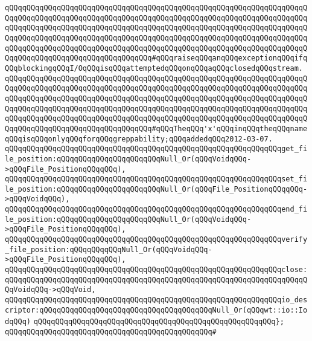 \verb|qQQqqQQqqQQqqQQqqQQqqQQqqQQqqQQqqQQqqQQqqQQqqQQqqQQqqQQqqQQqqQQqqQQqqQQqqQQqqQQqqQQqqQQqqQQqqQQqqQQqqQQqqQQqqQQqqQQqqQQqqQQqqQQqqQQqqQQqqQQqqQQqqQQqqQQqqQQqqQQqqQQqqQQqqQQqqQQqqQQqqQQqqQQqqQQqqQQqqQQqqQQqqQQqqQQqqQQqqQQqqQQqqQQqqQQqqQQqqQQqqQQqqQQqqQQqqQQqqQQqqQQqqQQqqQQqqQQqqQQqqQQqqQQqqQQqqQQqqQQqqQQqqQQqqQQqqQQqqQQqqQQqqQQqqQQqqQQqqQQqqQQqqQQqqQQqqQQqqQQqqQQqqQQqqQQqqQQqqQQqqQQq#qQQqraiseqQQqanqQQqexceptionqQQqifqQQqblockingqQQqI/OqQQqisqQQqattemptedqQQqonqQQqaqQQqclosedqQQqstream.|\newline
\verb|qQQqqQQqqQQqqQQqqQQqqQQqqQQqqQQqqQQqqQQqqQQqqQQqqQQqqQQqqQQqqQQqqQQqqQQqqQQqqQQqqQQqqQQqqQQqqQQqqQQqqQQqqQQqqQQqqQQqqQQqqQQqqQQqqQQqqQQqqQQqqQQqqQQqqQQqqQQqqQQqqQQqqQQqqQQqqQQqqQQqqQQqqQQqqQQqqQQqqQQqqQQqqQQqqQQqqQQqqQQqqQQqqQQqqQQqqQQqqQQqqQQqqQQqqQQqqQQqqQQqqQQqqQQqqQQqqQQqqQQqqQQqqQQqqQQqqQQqqQQqqQQqqQQqqQQqqQQqqQQqqQQqqQQqqQQqqQQqqQQqqQQqqQQqqQQqqQQqqQQqqQQqqQQqqQQqqQQqqQQqqQQq#qQQqTheqQQq'x'qQQqinqQQqtheqQQqnameqQQqisqQQqonlyqQQqforqQQqgreppability;qQQqaddedqQQq2012-03-07.|\newline
\newline
\verb|qQQqqQQqqQQqqQQqqQQqqQQqqQQqqQQqqQQqqQQqqQQqqQQqqQQqqQQqqQQqqQQqget_file_position:qQQqqQQqqQQqqQQqqQQqqQQqNull_Or(qQQqVoidqQQq->qQQqFile_PositionqQQqqQQq),|\newline
\verb|qQQqqQQqqQQqqQQqqQQqqQQqqQQqqQQqqQQqqQQqqQQqqQQqqQQqqQQqqQQqqQQqset_file_position:qQQqqQQqqQQqqQQqqQQqqQQqNull_Or(qQQqFile_PositionqQQqqQQq->qQQqVoidqQQq),|\newline
\newline
\verb|qQQqqQQqqQQqqQQqqQQqqQQqqQQqqQQqqQQqqQQqqQQqqQQqqQQqqQQqqQQqqQQqend_file_position:qQQqqQQqqQQqqQQqqQQqqQQqNull_Or(qQQqVoidqQQq->qQQqFile_PositionqQQqqQQq),|\newline
\verb|qQQqqQQqqQQqqQQqqQQqqQQqqQQqqQQqqQQqqQQqqQQqqQQqqQQqqQQqqQQqqQQqverify_file_position:qQQqqQQqqQQqNull_Or(qQQqVoidqQQq->qQQqFile_PositionqQQqqQQq),|\newline
\newline
\verb|qQQqqQQqqQQqqQQqqQQqqQQqqQQqqQQqqQQqqQQqqQQqqQQqqQQqqQQqqQQqqQQqclose:qQQqqQQqqQQqqQQqqQQqqQQqqQQqqQQqqQQqqQQqqQQqqQQqqQQqqQQqqQQqqQQqqQQqqQQqVoidqQQq->qQQqVoid,|\newline
\verb|qQQqqQQqqQQqqQQqqQQqqQQqqQQqqQQqqQQqqQQqqQQqqQQqqQQqqQQqqQQqqQQqio_descriptor:qQQqqQQqqQQqqQQqqQQqqQQqqQQqqQQqqQQqqQQqNull_Or(qQQqwt::io::IodqQQq)|\newline
\verb|qQQqqQQqqQQqqQQqqQQqqQQqqQQqqQQqqQQqqQQqqQQqqQQqqQQqqQQq};|\newline
\verb|qQQqqQQqqQQqqQQqqQQqqQQqqQQqqQQqqQQqqQQqqQQqqQQq#|\newline
